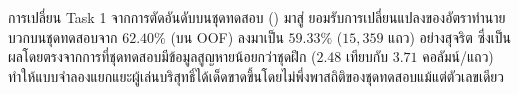 \begin{warningbox}
การเปลี่ยน Task 1 จากการตัดอันดับบนชุดทดสอบ () มาสู่  ยอมรับการเปลี่ยนแปลงของอัตราทำนายบวกบนชุดทดสอบจาก $62.40\%$ (บน OOF) ลงมาเป็น $59.33\%$ ($15{,}359$ แถว) อย่างสุจริต ซึ่งเป็นผลโดยตรงจากการที่ชุดทดสอบมีข้อมูลสูญหายน้อยกว่าชุดฝึก ($2.48$ เทียบกับ $3.71$ คอลัมน์/แถว) ทำให้แบบจำลองแยกแยะผู้เล่นบริสุทธิ์ได้เด็ดขาดขึ้นโดยไม่พึ่งพาสถิติของชุดทดสอบแม้แต่ตัวเลขเดียว
\end{warningbox}
